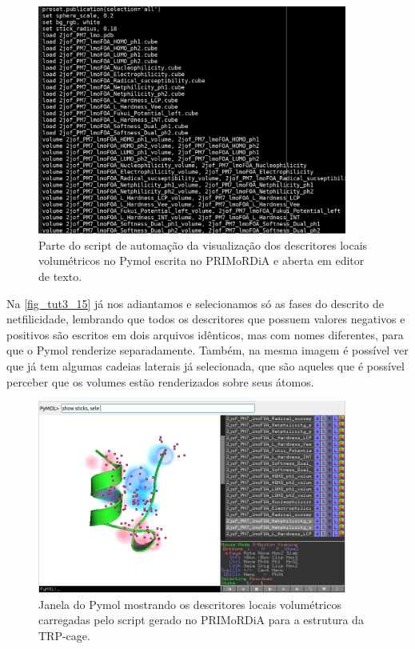 \documentclass[a4paper,11pt]{refart}
\begin{document}
\hspace*{-\leftmarginwidth}
\begin{minipage}{\fullwidth}
	\begin{figure}[H]
		\begin{center}
			\includegraphics[width=4in]{images/tut3_img15}
			\caption{Parte do script de automação da visualização dos descritores locais volumétricos no Pymol escrita no PRIMoRDiA e aberta em editor de texto.}
			\label{fig_tut3_13}
		\end{center}
	\end{figure}
\end{minipage}



Na \autoref{fig_tut3_15} já nos adiantamos e selecionamos só as fases do descrito de netfilicidade, lembrando que todos os descritores que possuem valores negativos e positivos são escritos em dois arquivos idênticos, mas com nomes diferentes, para que o Pymol renderize separadamente. Também, na mesma imagem é possível ver que já tem algumas cadeias laterais já selecionada, que são aqueles que é possível perceber que os volumes estão renderizados sobre seus átomos. 


\hspace*{-\leftmarginwidth}
\begin{minipage}{\fullwidth}
	\begin{figure}[H]
		\begin{center}
			\includegraphics[width=4in]{images/tut3_img17}
			\caption{Janela do Pymol mostrando os descritores locais volumétricos carregadas pelo script gerado no PRIMoRDiA para a estrutura da TRP-cage.}
			\label{fig_tut3_15}
		\end{center}
	\end{figure}
\end{minipage}
\end{document}
